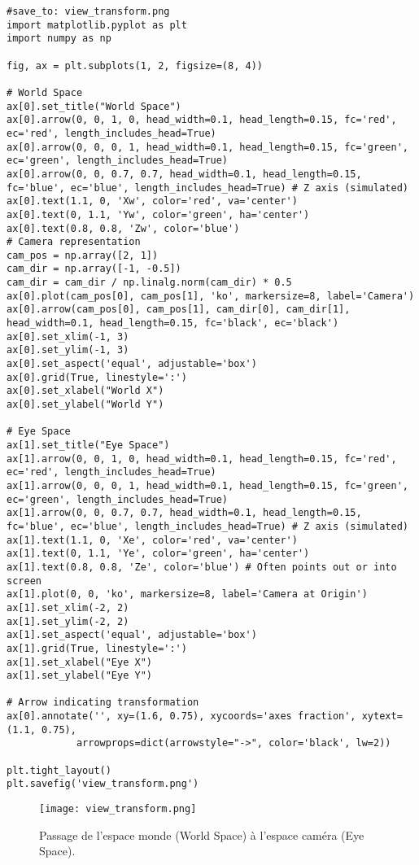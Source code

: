 \documentclass{article}
\begin{document}
\begin{verbatim}
#save_to: view_transform.png
import matplotlib.pyplot as plt
import numpy as np

fig, ax = plt.subplots(1, 2, figsize=(8, 4))

# World Space
ax[0].set_title("World Space")
ax[0].arrow(0, 0, 1, 0, head_width=0.1, head_length=0.15, fc='red', ec='red', length_includes_head=True)
ax[0].arrow(0, 0, 0, 1, head_width=0.1, head_length=0.15, fc='green', ec='green', length_includes_head=True)
ax[0].arrow(0, 0, 0.7, 0.7, head_width=0.1, head_length=0.15, fc='blue', ec='blue', length_includes_head=True) # Z axis (simulated)
ax[0].text(1.1, 0, 'Xw', color='red', va='center')
ax[0].text(0, 1.1, 'Yw', color='green', ha='center')
ax[0].text(0.8, 0.8, 'Zw', color='blue')
# Camera representation
cam_pos = np.array([2, 1])
cam_dir = np.array([-1, -0.5])
cam_dir = cam_dir / np.linalg.norm(cam_dir) * 0.5
ax[0].plot(cam_pos[0], cam_pos[1], 'ko', markersize=8, label='Camera')
ax[0].arrow(cam_pos[0], cam_pos[1], cam_dir[0], cam_dir[1], head_width=0.1, head_length=0.15, fc='black', ec='black')
ax[0].set_xlim(-1, 3)
ax[0].set_ylim(-1, 3)
ax[0].set_aspect('equal', adjustable='box')
ax[0].grid(True, linestyle=':')
ax[0].set_xlabel("World X")
ax[0].set_ylabel("World Y")

# Eye Space
ax[1].set_title("Eye Space")
ax[1].arrow(0, 0, 1, 0, head_width=0.1, head_length=0.15, fc='red', ec='red', length_includes_head=True)
ax[1].arrow(0, 0, 0, 1, head_width=0.1, head_length=0.15, fc='green', ec='green', length_includes_head=True)
ax[1].arrow(0, 0, 0.7, 0.7, head_width=0.1, head_length=0.15, fc='blue', ec='blue', length_includes_head=True) # Z axis (simulated)
ax[1].text(1.1, 0, 'Xe', color='red', va='center')
ax[1].text(0, 1.1, 'Ye', color='green', ha='center')
ax[1].text(0.8, 0.8, 'Ze', color='blue') # Often points out or into screen
ax[1].plot(0, 0, 'ko', markersize=8, label='Camera at Origin')
ax[1].set_xlim(-2, 2)
ax[1].set_ylim(-2, 2)
ax[1].set_aspect('equal', adjustable='box')
ax[1].grid(True, linestyle=':')
ax[1].set_xlabel("Eye X")
ax[1].set_ylabel("Eye Y")

# Arrow indicating transformation
ax[0].annotate('', xy=(1.6, 0.75), xycoords='axes fraction', xytext=(1.1, 0.75),
            arrowprops=dict(arrowstyle="->", color='black', lw=2))

plt.tight_layout()
plt.savefig('view_transform.png')
\end{verbatim}

\begin{figure}[H]
\centering
\texttt{[image: view\_transform.png]}
\caption{Passage de l'espace monde (World Space) à l'espace caméra (Eye Space).}
\label{fig:view_transform}
\end{figure}
\end{document}
